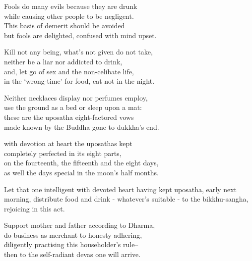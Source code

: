 \begin{MyDescription}{}
Fools do many evils because they are drunk\\
while causing other people to be negligent.\\
This basis of demerit should be avoided\\
but fools are delighted, confused with mind upset.
\end{MyDescription}

\begin{MyDescription}{}
Kill not any being, what's not given do not take,\\
neither be a liar nor addicted to drink,\\
and, let go of sex and the non-celibate life,\\
in the `wrong-time' for food, eat not in the night.
\end{MyDescription}

\begin{MyDescription}{}
Neither necklaces display nor perfumes employ,\\
use the ground as a bed or sleep upon a mat:\\
these are the uposatha eight-factored vows\\
made known by the Buddha gone to dukkha's end.
\end{MyDescription}

\begin{MyDescription}{}
with devotion at heart the uposathas kept\\
completely perfected in its eight parts,\\
on the fourteenth, the ﬁfteenth and the eight days,\\
as well the days special in the moon's half months.
\end{MyDescription}

\begin{MyDescription}{}
Let that one intelligent with devoted heart
having kept uposatha, early next morning,
distribute food and drink - whatever's suitable -
to the bikkhu-sangha, rejoicing in this act.
\end{MyDescription}


\begin{MyDescription}{}
Support mother and father according to Dharma,\\
do business as merchant to honesty adhering,\\
diligently practising this householder's rule--\\
then to the self-radiant devas one will arrive.
\end{MyDescription}


